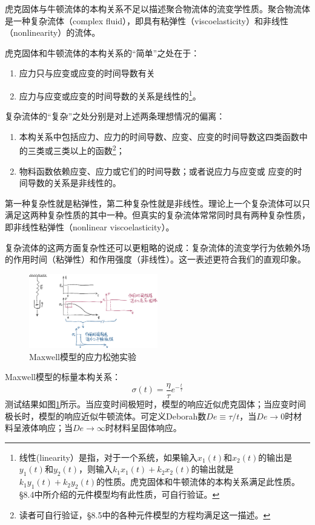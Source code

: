 \documentclass[main.tex]{subfiles}
\begin{document}
虎克固体与牛顿流体的本构关系不足以描述聚合物流体的流变学性质。聚合物流体是一种复杂流体（complex fluid），即具有粘弹性（viscoelasticity）和非线性（nonlinearity）的流体。

虎克固体和牛顿流体的本构关系的“简单”之处在于：
\begin{enumerate}
    \item 应力只与应变或应变的时间导数有关
    \item 应力与应变或应变的时间导数的关系是线性的\footnote{线性(linearity）是指，对于一个系统，如果输入\(x_1\left(t\right)\)和\(x_2\left(t\right)\)的输出是\(y_1\left(t\right)\)和\(y_2\left(t\right)\)，则输入\(k_1x_1\left(t\right)+k_2x_2\left(t\right)\)的输出就是\(k_1y_1\left(t\right)+k_2y_2\left(t\right)\)的性质。虎克固体和牛顿流体的本构关系满足此性质。\S 8.4中所介绍的元件模型均有此性质，可自行验证。}。
\end{enumerate}
复杂流体的“复杂”之处分别是对上述两条理想情况的偏离：
\begin{enumerate}
    \item 本构关系中包括应力、应力的时间导数、应变、应变的时间导数这四类函数中的三类或三类以上的函数\footnote{读者可自行验证，\S 8.5中的各种元件模型的方程均满足这一描述。}；
    \item 物料函数依赖应变、应力或它们的时间导数；或者说应力与应变或
    应变的时间导数的关系是非线性的。
\end{enumerate}
第一种复杂性就是粘弹性，第二种复杂性就是非线性。理论上一个复杂流体可以只满足这两种复杂性质的其中一种。但真实的复杂流体常常同时具有两种复杂性质，即非线性粘弹性（nonlinear viscoelasticity）。

复杂流体的这两方面复杂性还可以更粗略的说成：复杂流体的流变学行为依赖外场的作用时间（粘弹性）和作用强度（非线性）。这一表述更符合我们的直观印象。

\begin{figure}[h]
\centering
\includegraphics[width=0.5\textwidth]{images/I.2.1.eps}
\caption{Maxwell模型的应力松弛实验}
\label{fig:I.2.1}
\end{figure}

\begin{example}[粘弹性]
Maxwell模型的标量本构关系\cite[\S8.5.1,p.~240]{何曼君2007}：
\[\sigma\left(t\right)=\frac{\eta}{\tau}e^{-\frac{t}{\tau}}\]
测试结果如图\ref{fig:I.2.1}所示。当应变时间极短时，模型的响应近似虎克固体；当应变时间极长时，模型的响应近似牛顿流体。可定义Deborah数$De\equiv\tau/t$，当$De\rightarrow0$时材料呈液体响应；当$De\rightarrow\infty$时材料呈固体响应。
\end{example}
\end{document}
